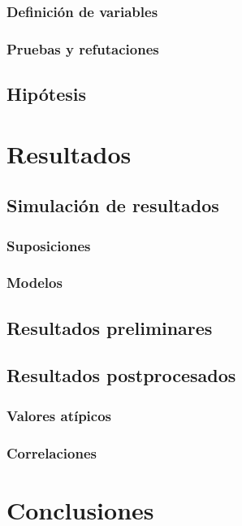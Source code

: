 \documentclass[12pt]{book}
\begin{document}
\subsection{Definición de variables}

\subsection{Pruebas y refutaciones}

\section{Hipótesis}


\chapter{Resultados}

\section{Simulación de resultados}

\subsection{Suposiciones}

\subsection{Modelos}

\section{Resultados preliminares}

\section{Resultados postprocesados}

\subsection{Valores atípicos}

\subsection{Correlaciones}


\chapter{Conclusiones}
\end{document}
